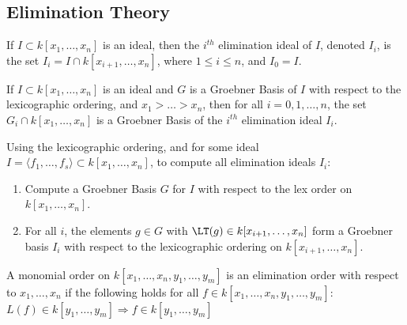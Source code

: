 \documentclass[crop=false,class=book,oneside]{standalone}
\begin{document}
        \subsection{Elimination Theory}
            \begin{definition}
                If $I\subset{k}[x_1,\hdots,x_{n}]$ is an ideal,
                then the $i^{th}$ elimination ideal of $I$,
                denoted $I_{i}$, is the set
                $I_{i}=I\cap{k}[x_{i+1},\hdots,x_{n}]$,
                where $1\leq{i}\leq{n}$, and $I_{0}=I$.
            \end{definition}
            \begin{theorem}
                If $I\subset k[x_1,\hdots ,x_n]$ is an ideal and
                $G$ is a Groebner Basis of $I$ with respect to the
                lexicographic ordering, and $x_1>\hdots > x_n$, then
                for all $i=0,1,\hdots,n$, the set
                $G_{i}\cap{k}[x_1,\hdots,x_n]$ is a Groebner Basis of
                the $i^{th}$ elimination ideal $I_{i}$.
            \end{theorem}
            \begin{remark}
                Using the lexicographic ordering, and for some ideal
                $I=\langle{f_{1}},\hdots,f_{s}\rangle%
                   \subset{k}[x_1,\hdots ,x_n]$,
                to compute all elimination ideals $I_{i}$:
                \begin{enumerate}
                    \item Compute a Groebner Basis $G$ for $I$ with
                          respect to the lex order on $k[x_1,\hdots,x_n]$.
                    \item For all $i$, the elements $g\in G$ with
                          $\LT(g)\in{k}[x_{i+1},\hdots,x_{n}]$ form a
                          Groebner basis $I_{i}$ with respect to
                          the lexicographic ordering on
                          $k[x_{i+1},\hdots,x_n]$.
                \end{enumerate}
            \end{remark}
            \begin{definition}
                A monomial order on
                $k[x_{1},\hdots,x_{n},y_{1},\hdots,y_{m}]$
                is an elimination order with respect to
                $x_{1},\hdots,x_{n}$ if the following holds for
                all $f\in{k}[x_{1},\hdots,x_{n},y_{1},\hdots,y_{m}]$:
                $L(f)\in{k}[y_{1},\hdots,y_{m}]%
                 \Rightarrow{f}\in{k}[y_{1},\hdots,y_{m}]$
            \end{definition}
\end{document}
